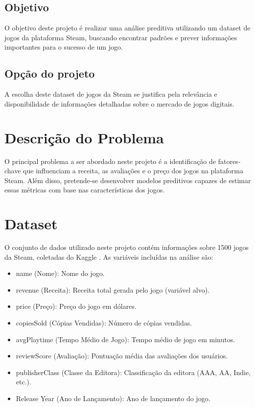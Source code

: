 \documentclass[12pt]{article}
\begin{document}
\subsection{Objetivo}

O objetivo deste projeto é realizar uma análise preditiva utilizando um dataset de 
jogos da plataforma Steam, buscando encontrar padrões e prever informações 
importantes para o sucesso de um jogo.

\subsection{Opção do projeto}

A escolha deste dataset de jogos da Steam se justifica pela relevância e 
disponibilidade de informações detalhadas sobre o mercado de jogos digitais.

\section{Descrição do Problema}

O principal problema a ser abordado neste projeto é a identificação de fatores-chave 
que influenciam a receita, as avaliações e o preço dos jogos na plataforma Steam. 
Além disso, pretende-se desenvolver modelos preditivos capazes de estimar essas 
métricas com base nas características dos jogos.

\section{Dataset}

O conjunto de dados utilizado neste projeto contém informações sobre 1500 jogos da Steam, coletadas do Kaggle \cite{topcu2024top1500}.  As variáveis incluídas na análise são:

\begin{itemize}
\item name (Nome): Nome do jogo.
\item revenue (Receita): Receita total gerada pelo jogo (variável alvo).
\item price (Preço): Preço do jogo em dólares.
\item copiesSold (Cópias Vendidas): Número de cópias vendidas.
\item avgPlaytime (Tempo Médio de Jogo): Tempo médio de jogo em minutos.
\item reviewScore (Avaliação): Pontuação média das avaliações dos usuários.
\item publisherClass (Classe da Editora): Classificação da editora (AAA, AA, Indie, etc.).
\item Release Year (Ano de Lançamento): Ano de lançamento do jogo.
\end{itemize}
\end{document}
